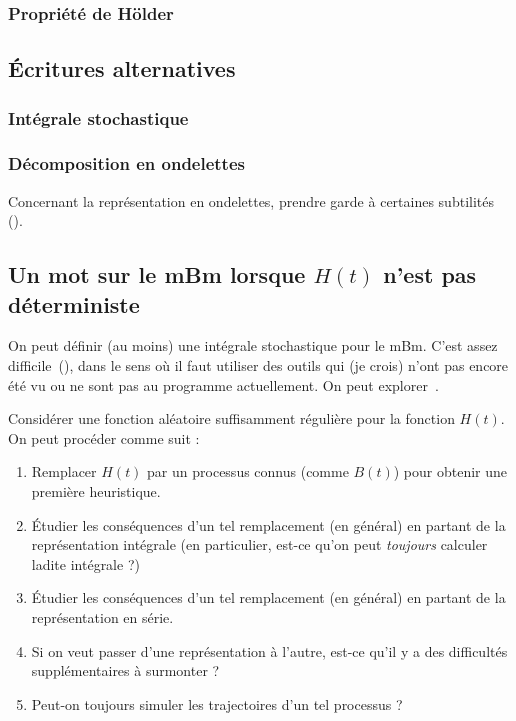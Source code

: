 \subsubsection{Propriété de Hölder}

\subsection{Écritures alternatives}

\subsubsection*{Intégrale stochastique}

\subsubsection*{Décomposition en ondelettes}

\begin{alert}
  Concernant la représentation en ondelettes, prendre garde à
  certaines subtilités (\cite{ayache2010}).
\end{alert}

\subsection{Un mot sur le mBm lorsque $H(t)$ n'est pas déterministe}

\begin{piste}
  On peut définir (au moins) une intégrale stochastique pour le
  mBm. C'est assez difficile~(\cite{lebovits2014}), dans le sens où il
  faut utiliser des outils qui (je crois) n'ont pas encore été vu ou
  ne sont pas au programme actuellement. On peut
  explorer~\cite{herbin2012}.
\end{piste}

\begin{piste}
  Considérer une fonction aléatoire suffisamment régulière pour la
  fonction $H(t)$. On peut procéder comme suit :
  \begin{enumerate}
  \item Remplacer $H(t)$ par un processus connus (comme $B(t)$) pour
    obtenir une première heuristique.
  \item Étudier les conséquences d'un tel remplacement (en général) en
    partant de la représentation intégrale (en particulier, est-ce
    qu'on peut \emph{toujours} calculer ladite intégrale ?)
  \item Étudier les conséquences d'un tel remplacement (en général) en
    partant de la représentation en série.
  \item Si on veut passer d'une représentation à l'autre, est-ce qu'il
    y a des difficultés supplémentaires à surmonter ?
  \item Peut-on toujours simuler les trajectoires d'un tel processus ?
  \end{enumerate}
\end{piste}
